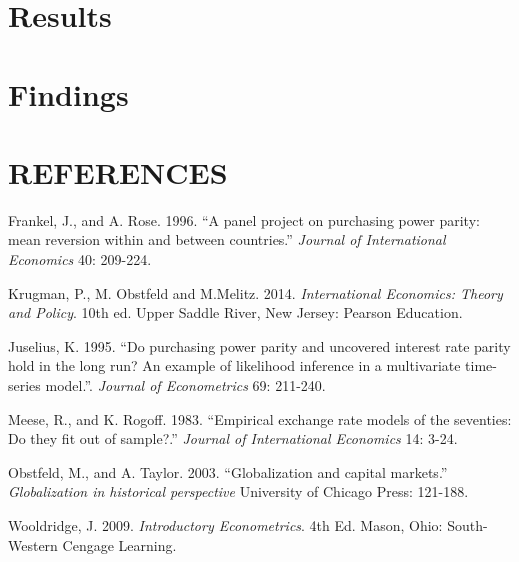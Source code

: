 \documentclass{sig-alternate-05-2015}
\begin{document}
\section{Results}

\section{Findings}
     
\newenvironment{hangref}{\begin{list}{}{\setlength{\itemsep}{0pt}
\setlength{\parsep}{0pt}\setlength{\rightmargin}{0pt}
\setlength{\leftmargin}{+\parindent}
\setlength{\itemindent}{-\parindent}}}{\end{list}}
\section*{REFERENCES}
\begin{hangref}

\item Frankel, J., and A. Rose. 1996.
``A panel project on purchasing power parity: mean reversion within and between countries.''
{\it Journal of International Economics} 40: 209-224.

\item Krugman, P., M. Obstfeld and M.Melitz.  2014.
{\it International Economics: Theory and Policy}. 10th ed.
Upper Saddle River, New Jersey: Pearson Education.

\item Juselius, K. 1995.
``Do purchasing power parity and uncovered interest rate parity hold in the long run? An example of likelihood inference in a multivariate time-series model.''.
{\it Journal of Econometrics} 69: 211-240.

\item Meese, R., and K. Rogoff. 1983.
``Empirical exchange rate models of the seventies: Do they fit out of sample?.'' 
{\it Journal of International Economics} 14: 3-24.

\item Obstfeld, M., and A. Taylor. 2003.
``Globalization and capital markets.'' 
{\it Globalization in historical perspective}
University of Chicago Press: 121-188.

\item Wooldridge, J. 2009.
{\it Introductory Econometrics}. 4th Ed.
Mason, Ohio: South-Western Cengage Learning.





\end{hangref}

\clearpage
\end{document}
